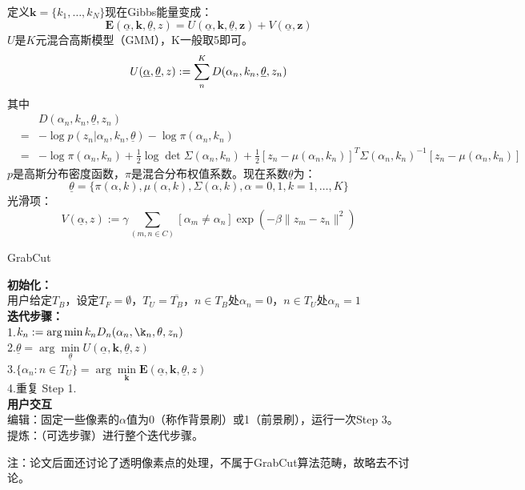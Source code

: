 \documentclass[a4paper, 11pt, nofonts, nocap, fancyhdr, hyperref, UTF8]{ctexart}
\begin{document}
定义$\textbf{k} = \{k_1,\ldots,k_N\}$现在Gibbs能量变成：
$$
\textbf{E}(\underline{\alpha},\textbf{k},\underline{\theta},z) = U(\underline{\alpha},\textbf{k},\underline{\theta},\textbf{z})+V(\underline{\alpha},\textbf{z})
$$
$U$是$K$元混合高斯模型（GMM），K一般取5即可。
$$
U(\underline{\alpha},\underline{\theta},z) := \sum \limits_n \limits^K D(\alpha_n,k_n,\underline{\theta},z_n) \\
$$
其中
\begin{eqnarray}
&&D(\alpha_n,k_n,\underline{\theta},z_n)\nonumber\\
&=&-\log p(z_n|\alpha_n,k_n,\underline{\theta})-\log\pi(\alpha_n,k_n) \nonumber\\
&=& -\log \pi(\alpha_n,k_n)+\frac{1}{2}\log\det \Sigma(\alpha_n,k_n)+\frac{1}{2}[z_n-\mu(\alpha_n,k_n)]^T\Sigma(\alpha_n,k_n)^{-1}[z_n-\mu(\alpha_n,k_n)]\nonumber
\end{eqnarray}
$p$是高斯分布密度函数，$\pi$是混合分布权值系数。现在系数$\underline{\theta}$为：
$$
\underline{\theta} = \{\pi(\alpha,k), \mu(\alpha,k), \Sigma(\alpha,k), \alpha = 0,1, k = 1,\ldots,K\}
$$
光滑项：
$$
V(\underline{\alpha},z) := \gamma \sum_{(m,n \in C)} [\alpha_m \neq \alpha_n]  \exp (-\beta \|z_m - z_n\|^2)
$$

\begin{algorithm}
\caption{GrabCut}\label{GC}
\textbf{初始化：}\\用户给定$T_B$，设定$T_F = \emptyset$，$T_U = \overline{T_B}$，$n \in T_B$处$\alpha_n = 0$，$n \in T_U$处$\alpha_n = 1$\\
\textbf{迭代步骤：}\\
1.$k_n := \arg \min \limits{k_n} D_n(\alpha_n,\k_n,\theta, z_n)$\\
2.$\underline{\theta}=\arg \min \limits_{\underline{\theta}} U(\underline{\alpha},\textbf{k},\underline{\theta},z)$\\
3.$\{\alpha_n:n \in T_U\} = \arg \min \limits_{\textbf{k}} \textbf{E}(\underline{\alpha},\textbf{k},\underline{\theta},z)$\\
4.重复 Step 1.\\
\textbf{用户交互}\\
编辑：固定一些像素的$\alpha$值为0（称作背景刷）或1（前景刷），运行一次Step 3。\\
提炼：（可选步骤）进行整个迭代步骤。
\end{algorithm}

注：论文后面还讨论了透明像素点的处理，不属于GrabCut算法范畴，故略去不讨论。
\end{document}
